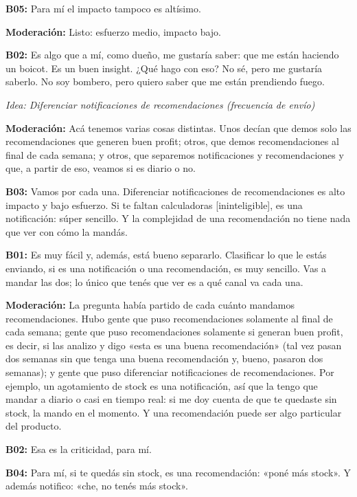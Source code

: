 \noindent\textbf{B05:} Para mí el impacto tampoco es altísimo.

\noindent\textbf{Moderación:} Listo: esfuerzo medio, impacto bajo.

\noindent\textbf{B02:} Es algo que a mí, como dueño, me gustaría saber: que me están haciendo un boicot. Es un buen insight. ¿Qué hago con eso? No sé, pero me gustaría saberlo. No soy bombero, pero quiero saber que me están prendiendo fuego.

\medskip\noindent\textit{Idea: Diferenciar notificaciones de recomendaciones (frecuencia de envío)}

\noindent\textbf{Moderación:} Acá tenemos varias cosas distintas. Unos decían que demos solo las recomendaciones que generen buen profit; otros, que demos recomendaciones al final de cada semana; y otros, que separemos notificaciones y recomendaciones y que, a partir de eso, veamos si es diario o no.

\noindent\textbf{B03:} Vamos por cada una. Diferenciar notificaciones de recomendaciones es alto impacto y bajo esfuerzo. Si te faltan calculadoras [ininteligible], es una notificación: súper sencillo. Y la complejidad de una recomendación no tiene nada que ver con cómo la mandás.

\noindent\textbf{B01:} Es muy fácil y, además, está bueno separarlo. Clasificar lo que le estás enviando, si es una notificación o una recomendación, es muy sencillo. Vas a mandar las dos; lo único que tenés que ver es a qué canal va cada una.

\noindent\textbf{Moderación:} La pregunta había partido de cada cuánto mandamos recomendaciones. Hubo gente que puso recomendaciones solamente al final de cada semana; gente que puso recomendaciones solamente si generan buen profit, es decir, si las analizo y digo «esta es una buena recomendación» (tal vez pasan dos semanas sin que tenga una buena recomendación y, bueno, pasaron dos semanas); y gente que puso diferenciar notificaciones de recomendaciones. Por ejemplo, un agotamiento de stock es una notificación, así que la tengo que mandar a diario o casi en tiempo real: si me doy cuenta de que te quedaste sin stock, la mando en el momento. Y una recomendación puede ser algo particular del producto.

\noindent\textbf{B02:} Esa es la criticidad, para mí.

\noindent\textbf{B04:} Para mí, si te quedás sin stock, es una recomendación: «poné más stock». Y además notifico: «che, no tenés más stock».

